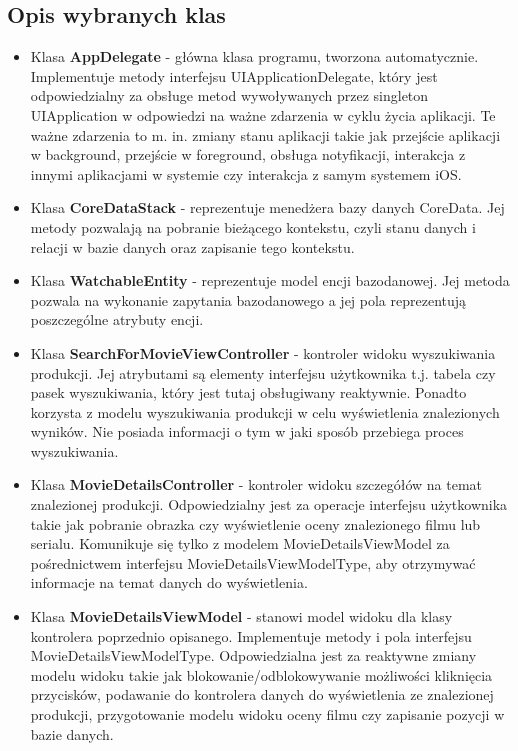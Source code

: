 \documentclass[12pt,oneside,a4paper]{report}
\begin{document}
\subsection{Opis wybranych klas}
\begin{itemize}
	\item Klasa \textbf{AppDelegate} - główna klasa programu, tworzona automatycznie. Implementuje metody interfejsu UIApplicationDelegate, który jest odpowiedzialny za obsługe metod wywoływanych przez singleton UIApplication w odpowiedzi na ważne zdarzenia w cyklu życia aplikacji. Te ważne zdarzenia to m. in. zmiany stanu aplikacji takie jak przejście aplikacji w background, przejście w foreground, obsługa notyfikacji, interakcja z innymi aplikacjami w systemie czy interakcja z samym systemem iOS.
	\item Klasa \textbf{CoreDataStack} -  reprezentuje menedżera bazy danych CoreData. Jej metody pozwalają na pobranie bieżącego kontekstu, czyli stanu danych i relacji w bazie danych oraz zapisanie tego kontekstu.
	\item Klasa \textbf{WatchableEntity} - reprezentuje model encji bazodanowej. Jej metoda pozwala na wykonanie zapytania bazodanowego a jej pola reprezentują poszczególne atrybuty encji.
	\item Klasa \textbf{SearchForMovieViewController} - kontroler widoku wyszukiwania produkcji. Jej atrybutami są elementy interfejsu użytkownika t.j. tabela czy pasek wyszukiwania, który jest tutaj obsługiwany reaktywnie. Ponadto korzysta z modelu wyszukiwania produkcji w celu wyświetlenia znalezionych wyników. Nie posiada informacji o tym w jaki sposób przebiega proces wyszukiwania. 
	\item Klasa \textbf{MovieDetailsController} - kontroler widoku szczegółów na temat znalezionej produkcji. Odpowiedzialny jest za operacje interfejsu użytkownika takie jak pobranie obrazka czy wyświetlenie oceny znalezionego filmu lub serialu. Komunikuje się tylko z modelem MovieDetailsViewModel za pośrednictwem interfejsu MovieDetailsViewModelType, aby otrzymywać informacje na temat danych do wyświetlenia.
	\item Klasa \textbf{MovieDetailsViewModel} - stanowi model widoku dla klasy kontrolera poprzednio opisanego. Implementuje metody i pola interfejsu MovieDetailsViewModelType. Odpowiedzialna jest za reaktywne zmiany modelu widoku takie jak blokowanie/odblokowywanie możliwości kliknięcia przycisków, podawanie do kontrolera danych do wyświetlenia ze znalezionej produkcji, przygotowanie modelu widoku oceny filmu czy zapisanie pozycji w bazie danych. 

\end{itemize}
\end{document}

